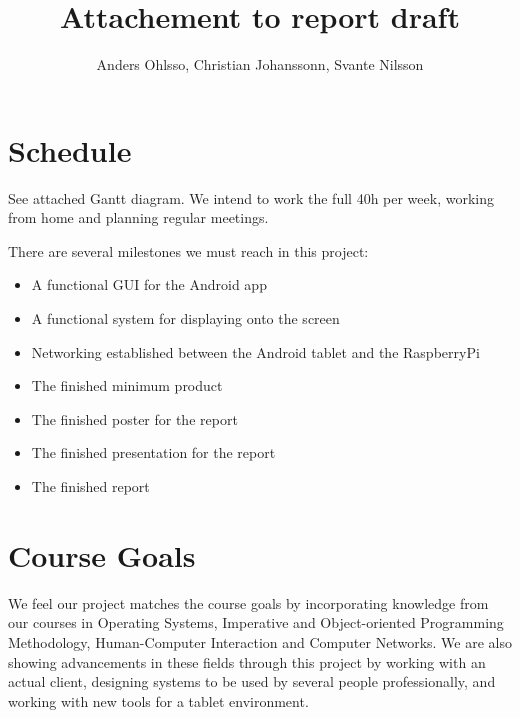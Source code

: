 \documentclass{article}
\begin{document}
\title{Attachement to report draft}
\author{Anders Ohlsso, Christian Johanssonn, Svante Nilsson}
\maketitle
\section{Schedule}
See attached Gantt diagram. We intend to work the full 40h per week, working from home and planning regular meetings.

There are several milestones we must reach in this project:

\begin{itemize}
	\item A functional GUI for the Android app
	\item A functional system for displaying onto the screen
	\item Networking established between the Android tablet and the RaspberryPi
	\item The finished minimum product
	\item The finished poster for the report
	\item The finished presentation for the report
	\item The finished report
\end{itemize}

\section{Course Goals}
We feel our project matches the course goals by incorporating knowledge from our courses in Operating Systems, Imperative and Object-oriented Programming Methodology, Human-Computer Interaction and Computer Networks. We are also showing advancements in these fields through this project by working with an actual client, designing systems to be used by several people professionally, and working with new tools for a tablet environment.
\end{document}
